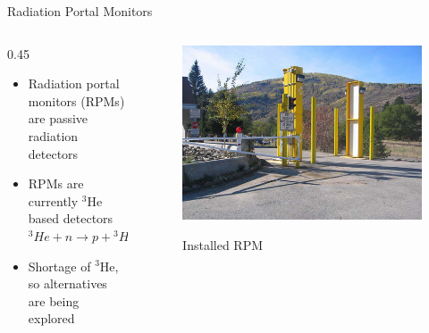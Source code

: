 \begin{frame}{Radiation Portal Monitors}
\begin{columns}[onlytextwidth]
	\begin{column} {0.45\textwidth}
  	\begin{itemize}
  		\item Radiation portal monitors (RPMs) are passive radiation detectors
  		\item {
  			 RPMs are currently   ${}^3$He based detectors
  			\center
    		${}^3He +n \to p +{}^3H$
    	}
  		\item 
  			Shortage of ${}^3$He, so alternatives are being explored
  		\end{itemize}
	\end{column}
	\begin{column}{0.5\textwidth}
		\centering
		\begin{figure}
			\includegraphics[width=\textwidth]{images/RPM8_Installed.eps}
			\label{fig:RPM8Installed}
			\caption{Installed RPM}
			\end{figure}
	\end{column}
\end{columns}
\end{frame}


